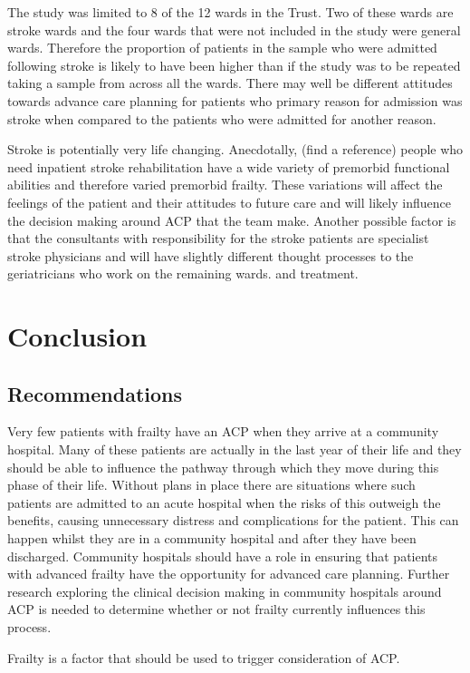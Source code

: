 \documentclass
[
	12pt,
	a4paper,
	oneside,
]{report}
\begin{document}
The study was limited to 8 of the 12 wards in the Trust. Two of these wards
are stroke wards and the four wards that were not included in the study were 
general wards. Therefore the proportion of patients in the sample
who were admitted following stroke is likely to have been higher than if the 
study was to be repeated taking a sample from across all the wards. There may 
well be different attitudes towards advance care planning for patients who 
primary reason for admission was stroke when compared to the patients who
were admitted for another reason.

Stroke is potentially very life changing. Anecdotally, (find a reference) 
people who need
inpatient stroke rehabilitation have a wide variety of premorbid functional 
abilities and therefore varied premorbid frailty. These variations will
affect the feelings of the patient and their attitudes to future care and will
likely influence the decision making around ACP that the team make. Another
possible factor is that the consultants with responsibility for the stroke 
patients are specialist stroke physicians and will have slightly different 
thought processes to the geriatricians who work on the remaining wards.
and treatment.

\chapter{Conclusion}

\section{Recommendations}
Very few patients with frailty have an ACP when they arrive at a community
hospital. Many of these patients are actually in the last year of their life
and they should be able to influence the pathway through which they move
during this phase of their life. Without plans in place there are situations
where such patients are admitted to an acute hospital when the risks of 
this outweigh the benefits, causing unnecessary distress and complications
for the patient. This can happen whilst they are in a community hospital
and after they have been discharged. Community hospitals should have a role 
in ensuring that patients with advanced frailty have the opportunity for
advanced care planning. 
Further research exploring the clinical decision making 
in community hospitals around ACP is needed to determine whether or not
frailty currently influences this process.

Frailty is a factor that should be used to trigger consideration of ACP.
\end{document}
